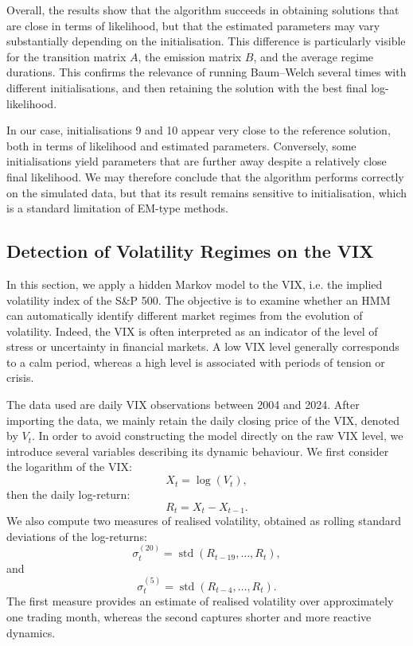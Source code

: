 \documentclass[11pt]{article}
\begin{document}
Overall, the results show that the algorithm succeeds in obtaining solutions that are close in terms of likelihood, but that the estimated parameters may vary substantially depending on the initialisation. This difference is particularly visible for the transition matrix $A$, the emission matrix $B$, and the average regime durations. This confirms the relevance of running Baum--Welch several times with different initialisations, and then retaining the solution with the best final log-likelihood.

In our case, initialisations 9 and 10 appear very close to the reference solution, both in terms of likelihood and estimated parameters. Conversely, some initialisations yield parameters that are further away despite a relatively close final likelihood. We may therefore conclude that the algorithm performs correctly on the simulated data, but that its result remains sensitive to initialisation, which is a standard limitation of EM-type methods.



\subsection{Detection of Volatility Regimes on the VIX}


In this section, we apply a hidden Markov model to the VIX, i.e. the implied volatility index of the S\&P 500. The objective is to examine whether an HMM can automatically identify different market regimes from the evolution of volatility. Indeed, the VIX is often interpreted as an indicator of the level of stress or uncertainty in financial markets. A low VIX level generally corresponds to a calm period, whereas a high level is associated with periods of tension or crisis.

The data used are daily VIX observations between 2004 and 2024. After importing the data, we mainly retain the daily closing price of the VIX, denoted by $V_t$. In order to avoid constructing the model directly on the raw VIX level, we introduce several variables describing its dynamic behaviour. We first consider the logarithm of the VIX:
\[
    X_t = \log(V_t),
\]
then the daily log-return:
\[
    R_t = X_t - X_{t-1}.
\]
We also compute two measures of realised volatility, obtained as rolling standard deviations of the log-returns:
\[
    \sigma^{(20)}_t = \operatorname{std}(R_{t-19},\dots,R_t),
\]
and
\[
    \sigma^{(5)}_t = \operatorname{std}(R_{t-4},\dots,R_t).
\]
The first measure provides an estimate of realised volatility over approximately one trading month, whereas the second captures shorter and more reactive dynamics.
\end{document}

